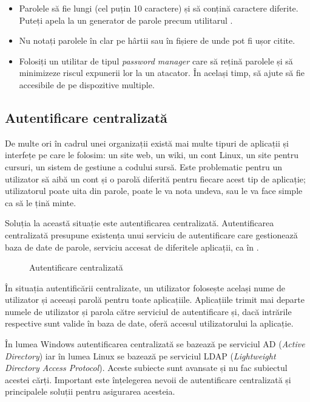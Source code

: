\begin{itemize}
  \item Parolele să fie lungi (cel puțin 10 caractere) și să conțină
          caractere diferite. Puteți apela la un generator de parole
          precum utilitarul .
  \item Nu notați parolele în clar pe hârtii sau în fișiere de unde pot fi
          ușor citite.
  \item Folosiți un utilitar de tipul \textit{password manager} care să rețină
          parolele și să minimizeze riscul expunerii lor la un atacator.
          În același timp, să ajute să fie accesibile de pe dispozitive
          multiple.
\end{itemize}

\subsection{Autentificare centralizată}
\label{sec:user:centralized-auth}

De multe ori în cadrul unei organizații există mai multe tipuri de aplicații și
interfețe pe care le folosim: un site web, un wiki, un cont Linux, un site
pentru cursuri, un sistem de gestiune a codului sursă. Este problematic pentru
un utilizator să aibă un cont și o parolă diferită pentru fiecare acest tip de
aplicație; utilizatorul poate uita din parole, poate le va nota undeva, sau le
va face simple ca să le țină minte.

Soluția la această situație este autentificarea centralizată. Autentificarea
centralizată presupune existența unui serviciu de autentificare care gestionează
baza de date de parole, serviciu accesat de diferitele aplicații, ca în .

\begin{figure}[htbp]
  \centering
  \def\svgwidth{0.7\columnwidth}
  
  \caption{Autentificare centralizată}
  \label{fig:user:centralized-auth}
\end{figure}

În situația autentificării centralizate, un utilizator folosește același nume de
utilizator și aceeași parolă pentru toate aplicațiile. Aplicațiile trimit mai
departe numele de utilizator și parola către serviciul de autentificare și, dacă
intrările respective sunt valide în baza de date, oferă accesul utilizatorului
la aplicație.

În lumea Windows autentificarea centralizată se bazează pe serviciul AD
 (\textit{Active Directory}) iar în lumea Linux se bazează
pe serviciul LDAP 
(\textit{Lightweight Directory Access Protocol}). Aceste subiecte sunt avansate și nu fac
subiectul acestei cărți. Important este înțelegerea nevoii de autentificare
centralizată și principalele soluții pentru asigurarea acesteia.

